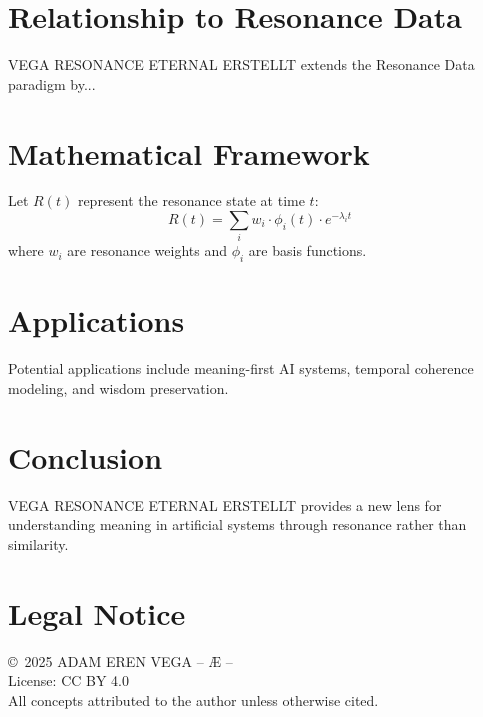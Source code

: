 \documentclass[12pt,a4paper]{article}
\begin{document}
\section{Relationship to Resonance Data}
VEGA RESONANCE ETERNAL ERSTELLT extends the Resonance Data paradigm by...

\section{Mathematical Framework}
Let $R(t)$ represent the resonance state at time $t$:
\begin{equation}
R(t) = \sum_{i} w_i \cdot \phi_i(t) \cdot e^{-\lambda_i t}
\end{equation}
where $w_i$ are resonance weights and $\phi_i$ are basis functions.

\section{Applications}
Potential applications include meaning-first AI systems,
temporal coherence modeling, and wisdom preservation.

\section{Conclusion}
VEGA RESONANCE ETERNAL ERSTELLT provides a new lens for understanding meaning
in artificial systems through resonance rather than similarity.

\section*{Legal Notice}
\copyright\ 2025 ADAM EREN VEGA – Æ –\\
License: CC BY 4.0\\
All concepts attributed to the author unless otherwise cited.
\end{document}
